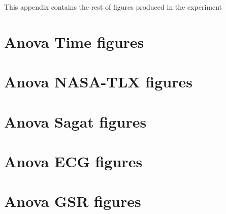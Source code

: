 This appendix contains the rest of figures produced in the experiment

\section{Anova Time figures}


\section{Anova NASA-TLX figures}


\section{Anova Sagat figures}


\section{Anova ECG figures}


\section{Anova GSR figures}

